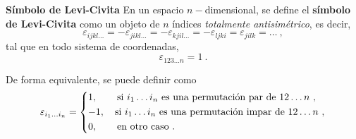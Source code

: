 \begin{defi} \textbf{Símbolo de Levi-Civita}
    En un espacio $n-$dimensional, se define el \textbf{símbolo de Levi-Civita} como un objeto de $n$ índices \emph{totalmente antisimétrico}, es decir,
    \begin{equation}
        \varepsilon_{ijkl\dots} = -\varepsilon_{jikl\dots} = - \varepsilon_{kjil\dots} = - \varepsilon_{ljki} = \varepsilon_{jilk} = \dots \ ,
    \end{equation}
    tal que en todo sistema de coordenadas,
    \begin{equation}
        \varepsilon_{123 \dots n} = 1 \ .
    \end{equation}

    De forma equivalente, se puede definir como
    \begin{equation}
        \varepsilon_{i_1 \dots i_n} = \begin{dcases}
            1, \qquad \text{si } i_1 \dots i_n \text{ es una permutación par de } 12 \dots n \ , \\
            -1, \quad \text{si } i_1 \dots i_n \text{ es una permutación impar de } 12 \dots n \ , \\
            0, \qquad \text{en otro caso} \ .
        \end{dcases}
    \end{equation}
\end{defi}


